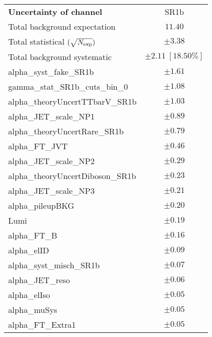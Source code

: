 
\begin{table}
\begin{center}
\setlength{\tabcolsep}{0.0pc}
\begin{tabular*}{\textwidth}{@{\extracolsep{\fill}}lc}
\noalign{\smallskip}\hline\noalign{\smallskip}
{\bf Uncertainty of channel}                                    & SR1b            \\
\noalign{\smallskip}\hline\noalign{\smallskip}
Total background expectation             &  $11.40$       \\
\noalign{\smallskip}\hline\noalign{\smallskip}
Total statistical $(\sqrt{N_{\rm exp}})$              & $\pm 3.38$       \\
Total background systematic               & $\pm 2.11\ [18.50\%] $             \\
\noalign{\smallskip}\hline\noalign{\smallskip}
\noalign{\smallskip}\hline\noalign{\smallskip}
alpha\_syst\_fake\_SR1b         & $\pm 1.61$       \\
gamma\_stat\_SR1b\_cuts\_bin\_0         & $\pm 1.08$       \\
alpha\_theoryUncertTTbarV\_SR1b         & $\pm 1.03$       \\
alpha\_JET\_scale\_NP1         & $\pm 0.89$       \\
alpha\_theoryUncertRare\_SR1b         & $\pm 0.79$       \\
alpha\_FT\_JVT         & $\pm 0.46$       \\
alpha\_JET\_scale\_NP2         & $\pm 0.29$       \\
alpha\_theoryUncertDiboson\_SR1b         & $\pm 0.23$       \\
alpha\_JET\_scale\_NP3         & $\pm 0.21$       \\
alpha\_pileupBKG         & $\pm 0.20$       \\
Lumi         & $\pm 0.19$       \\
alpha\_FT\_B         & $\pm 0.16$       \\
alpha\_elID         & $\pm 0.09$       \\
alpha\_syst\_misch\_SR1b         & $\pm 0.07$       \\
alpha\_JET\_reso         & $\pm 0.06$       \\
alpha\_elIso         & $\pm 0.05$       \\
alpha\_muSys         & $\pm 0.05$       \\
alpha\_FT\_Extra1         & $\pm 0.05$       \\

\end{tabular*}
\end{center}
\end{table}
